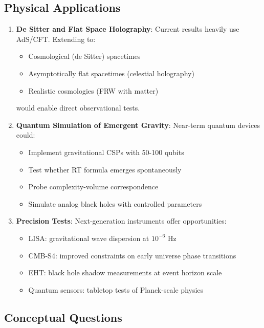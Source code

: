 \documentclass[11pt,a4paper]{article}
\theoremstyle{remark}
\theoremstyle{definition}
\begin{document}
\subsection{Physical Applications}

\begin{enumerate}
\item \textbf{De Sitter and Flat Space Holography}: Current results heavily use AdS/CFT. Extending to:
\begin{itemize}
\item Cosmological (de Sitter) spacetimes
\item Asymptotically flat spacetimes (celestial holography)
\item Realistic cosmologies (FRW with matter)
\end{itemize}
would enable direct observational tests.

\item \textbf{Quantum Simulation of Emergent Gravity}: Near-term quantum devices could:
\begin{itemize}
\item Implement gravitational CSPs with 50-100 qubits
\item Test whether RT formula emerges spontaneously
\item Probe complexity-volume correspondence
\item Simulate analog black holes with controlled parameters
\end{itemize}

\item \textbf{Precision Tests}: Next-generation instruments offer opportunities:
\begin{itemize}
\item LISA: gravitational wave dispersion at $10^{-6}$ Hz
\item CMB-S4: improved constraints on early universe phase transitions
\item EHT: black hole shadow measurements at event horizon scale
\item Quantum sensors: tabletop tests of Planck-scale physics
\end{itemize}
\end{enumerate}

\subsection{Conceptual Questions}
\end{document}
